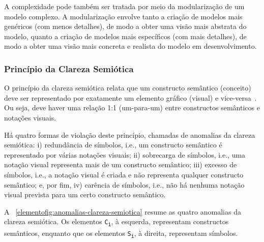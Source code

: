 A complexidade pode também ser tratada por meio da modularização de um modelo complexo. A modularização envolve tanto a criação de modelos mais genéricos (com menos detalhes), de modo a obter uma visão mais abstrata do modelo, quanto a criação de modelos mais específicos (com mais detalhes), de modo a obter uma visão mais concreta e realista do modelo em desenvolvimento.


\subsubsection{Princípio da Clareza Semiótica}\label{2-fundamentacao-notacao-visual-principio-clareza-semiotica}

O princípio da clareza semiótica relata que um constructo semântico (conceito) deve ser representado por exatamente um elemento gráfico (visual) e vice-versa~\cite{MOODY-2009-Physics-Notation}. Ou seja, deve haver uma relação 1:1 (um-para-um) entre constructos semânticos e notações visuais.

Há quatro formas de violação deste princípio, chamadas de anomalias da clareza semiótica: i) redundância de símbolos, i.e., um constructo semântico é representado por várias notações visuais; ii) sobrecarga de símbolos, i.e., uma notação visual representa mais de um constructo semântico; iii) excesso de símbolos, i.e., a notação visual é criada e não representa qualquer constructo semântico; e, por fim, iv) carência de símbolos, i.e., não há nenhuma notação visual prevista para um certo constructo semântico.

A \figurename~\ref{elementofig:anomalias-clareza-semiotica} resume as quatro anomalias da clareza semiótica. Os elementos \texttt{C\textsubscript{i}}, à esquerda, representam constructos semânticos, enquanto que os elementos \texttt{S\textsubscript{i}}, à direita, representam símbolos.

